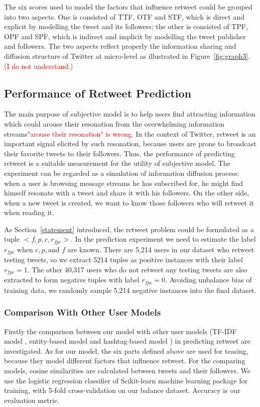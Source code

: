 \documentclass{acm_proc_article-sp}
\newcommand{\mo}[1]{\textcolor{red}{#1}}
\begin{document}
The six scores used to model the factors that influence retweet could be grouped into two aspects. 
One is consisted of TTF, OTF and STF, which is direct and explicit by modelling the tweet and its followers;
the other is consisted of TPF, OPF and SPF, which is indirect and implicit by modelling the tweet publisher and followers.
The two aspects reflect properly the information sharing and diffusion structure of Twitter at micro-level as illustrated in Figure~\ref{fig:graph3}. \mo{(I do not understand.)}

\subsection{Performance of Retweet Prediction }
\label{performance}
The main purpose of subjective model is to help users find attracting information which could arouse their resonation from the overwhelming information streams\mo{"arouse their resonation" is wrong}. 
In the context of Twitter, retweet is an important signal elicited by such resonation, because users are prone to broadcast their favorite tweets to their followers. 
Thus, the performance of predicting retweet is a suitable measurement for the utility of subjective model. The experiment can be regarded as a simulation of information diffusion process: when a user is browsing message streams he has subscribed for, he might find himself resonate with a tweet and share it with his followers. On the other side, when a new tweet is created, we want to know those followers who will retweet it when reading it.

As Section~\ref{statement} introduced, the retweet problem could be formulated as a tuple $< f, p, c, r_{fpc}> $.
In the prediction experiment we need to estimate the label $ r_{fpc} $ when $ c, p, \text{and } f $ are known. 
There are 5,214 users in our dataset who retweet testing tweets, so we extract 5214 tuples as positive instances with their label $ r_{fpc}=1 $.
The other 40,317 users who do not retweet any testing tweets are also extracted to form negative tuples with label $ r_{fpc}=0 $.
Avoiding unbalance bias of training data, we randomly sample 5,214 negative instances into the final dataset.

\subsubsection{Comparison With Other User Models}
\label{comparison}
Firstly the comparison between our model with other user models (TF-IDF model \cite{Luo:2013RMF}, entity-based model and hashtag-based model \cite{Abel:2011AUM}) in predicting retweet are investigated.
As for our model, the six parts defined above are used for teasing, because they model different factors that influence retweet.
For the comparing models, cosine similarities are calculated between tweets and their followers.
We use the logistic regression classifier of Scikit-learn machine learning package \cite{scikit-learn} for training, with 5-fold cross-validation on our balance dataset. Accuracy is our evaluation metric.
\end{document}
